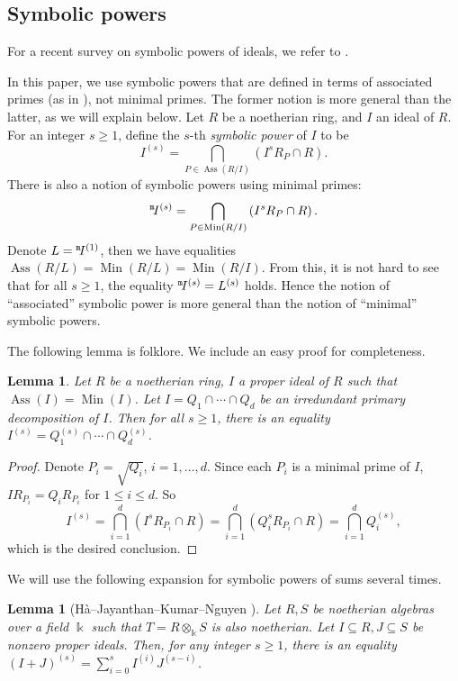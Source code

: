 \documentclass{amsart}
\DeclareMathOperator{\Ass}{Ass}
\DeclareMathOperator{\Min}{Min}
\theoremstyle{plain}
\newtheorem{lem}[thm]{Lemma}
\theoremstyle{definition}
\numberwithin{equation}{section}
\newcommand{\kk}{\Bbbk}
\newcommand{\up}[1]{{}^{\tt #1}\!}
\begin{document}

\subsection{Symbolic powers}
For a recent survey on symbolic powers of ideals, we refer to \cite{DDSG+18}.

In this paper, we use symbolic powers that are defined in terms of associated primes (as in \cite{DDSG+18}), not minimal primes. The former notion is more general than the latter, as we will explain below. Let $R$ be a noetherian ring, and $I$ an ideal of $R$. For an integer $s\ge 1$, define the $s$-th \emph{symbolic power} of $I$ to be
\[
I^{(s)}=\bigcap_{P \in \Ass(R/I)} \left(I^sR_P \cap R\right).
\]
There is also a notion of symbolic powers using minimal primes:
\[
\up{m}I^{(s)}=\bigcap_{P \in \Min(R/I)} \left(I^sR_P \cap R\right).
\]
Denote  $L={}\up{m}I^{(1)}$, then we have equalities $\Ass(R/L)=\Min(R/L)=\Min(R/I)$. From this, it is not hard to see that for all $s\ge 1$, the equality $\up{m}I^{(s)} = L^{(s)}$ holds. Hence the notion of ``associated'' symbolic power is more general than the notion of ``minimal'' symbolic powers.

The following lemma is folklore. We include an easy proof for completeness.
\begin{lem}
\label{lem_symbolic_powers}
Let $R$ be a noetherian ring, $I$ a proper ideal of $R$ such that $\Ass(I)=\Min(I)$. Let $I=Q_1\cap \cdots \cap Q_d$ be an irredundant primary decomposition of $I$. Then for all $s\ge 1$, there is an equality $I^{(s)}=Q_1^{(s)} \cap \cdots \cap Q_d^{(s)}$.
\end{lem}
\begin{proof}
Denote $P_i=\sqrt{Q_i}$, $i=1,\ldots,d$. Since each $P_i$ is a minimal prime of $I$, $IR_{P_i}=Q_iR_{P_i}$ for $1\le i\le d$. So
\[
I^{(s)}=\bigcap_{i=1}^d \left(I^sR_{P_i}\cap R \right)= \bigcap_{i=1}^d \left(Q_i^sR_{P_i}\cap R\right)=\bigcap_{i=1}^d Q_i^{(s)},
\]
which is the desired conclusion.
\end{proof}

We will use the following expansion for symbolic powers of sums several times.
\begin{lem}[H\`a--Jayanthan--Kumar--Nguyen {\cite[Theorem 4.1]{HJKN}}]
\label{lem_binomialformula}
 Let $R, S$ be noetherian algebras over a field $\kk$ such that $T=R\otimes_\kk S$ is also noetherian. Let $I \subseteq R, J \subseteq S$ be nonzero proper ideals. Then, for any integer $s \ge 1$, there is an equality $(I+J)^{(s)} = \sum\limits_{i=0}^s I^{(i)}J^{(s-i)}$.
\end{lem}
\end{document}
